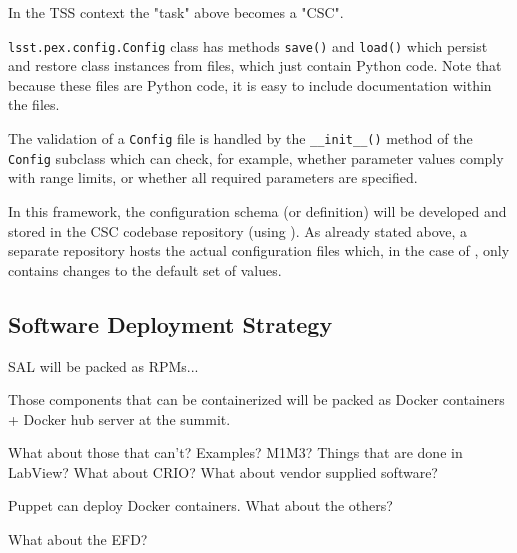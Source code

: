In the TSS context the "task" above becomes a "CSC". 

\texttt{lsst.pex.config.Config} class has methods \texttt{save()} and \texttt{load()} which persist and restore class instances from files, which just contain Python code. Note that because these files are Python code, it is easy to include documentation within the files.

The validation of a \texttt{Config} file is handled by the \texttt{\_\_init\_\_()} method of the \texttt{Config} subclass which can check, for example, whether parameter values comply with range limits, or whether all required parameters are specified.

In this framework, the configuration schema (or definition) will be developed and stored in the CSC codebase repository (using \pexC). As already stated above, a separate repository hosts the actual configuration files which, in the case of \pexC, only contains changes to the default set of values.



%


\subsection{Software Deployment Strategy}\label{sect:deploy}
SAL will be packed as RPMs...

Those components that can be containerized will be packed as Docker containers + Docker hub server at the summit.

What about those that can't? Examples? M1M3? Things that are done in LabView? What about CRIO? What about vendor supplied software?

Puppet can deploy Docker containers. What about the others? 

What about the EFD? 

